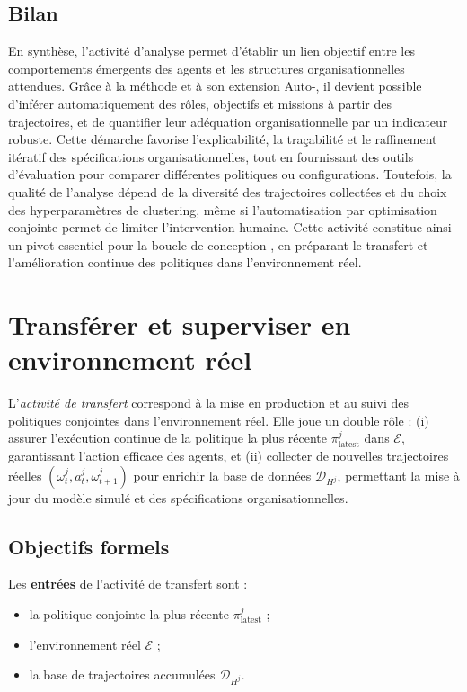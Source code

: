 \section{Bilan}

En synthèse, l'activité d'analyse permet d'établir un lien objectif entre les comportements émergents des agents et les structures organisationnelles attendues. Grâce à la méthode  et à son extension Auto-, il devient possible d'inférer automatiquement des rôles, objectifs et missions à partir des trajectoires, et de quantifier leur adéquation organisationnelle par un indicateur robuste. Cette démarche favorise l'explicabilité, la traçabilité et le raffinement itératif des spécifications organisationnelles, tout en fournissant des outils d'évaluation pour comparer différentes politiques ou configurations. Toutefois, la qualité de l'analyse dépend de la diversité des trajectoires collectées et du choix des hyperparamètres de clustering, même si l'automatisation par optimisation conjointe permet de limiter l'intervention humaine. Cette activité constitue ainsi un pivot essentiel pour la boucle de conception , en préparant le transfert et l'amélioration continue des politiques dans l'environnement réel.


\clearpage
\thispagestyle{empty}
\null
\newpage

\chapter{Transférer et superviser en environnement réel}
\label{chap:transferring}

L'\textit{activité de transfert} correspond à la mise en production et au suivi des politiques conjointes dans l'environnement réel.
Elle joue un double rôle : (i) assurer l'exécution continue de la politique la plus récente $\pi^j_{\text{latest}}$ dans $\mathcal{E}$, garantissant l'action efficace des agents, et (ii) collecter de nouvelles trajectoires réelles $(\omega^j_t, a^j_t, \omega^j_{t+1})$ pour enrichir la base de données $\mathcal{D}_{H^j}$, permettant la mise à jour du modèle simulé et des spécifications organisationnelles.

\section*{Objectifs formels}

Les \textbf{entrées} de l'activité de transfert sont :
\begin{itemize}
  \item la politique conjointe la plus récente $\pi^j_{\text{latest}}$ ;
  \item l'environnement réel $\mathcal{E}$ ;
  \item la base de trajectoires accumulées $\mathcal{D}_{H^j}$.
\end{itemize}

